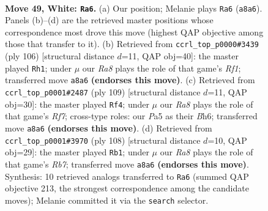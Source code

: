 \documentclass[11pt]{article}
\begin{document}
\clearpage

\begin{figure}[p]\centering
\begin{subfigure}{0.46\textwidth}\centering
\resizebox{\linewidth}{!}{%
\newchessgame
\chessboard[
  setfen={R6r/6k1/8/P7/8/6K1/8/8 w - - 1 49},
  showmover=false,
  pgfstyle=straightmove, color=movearrow, markmove={a8-a6}
]}
\caption{}
\end{subfigure}\hfill
\begin{subfigure}{0.46\textwidth}\centering
\resizebox{\linewidth}{!}{%
\newchessgame
\chessboard[
  setfen={5rk1/8/8/6pP/8/8/7K/5R2 w - - 10 54},
  showmover=false,
  pgfstyle=straightmove, color=movearrow, markmove={f1-h1}
]}
\caption{}
\end{subfigure}
\\[4pt]
\begin{subfigure}{0.46\textwidth}\centering
\resizebox{\linewidth}{!}{%
\newchessgame
\chessboard[
  setfen={8/8/6kb/8/8/8/R4r2/1K6 b - - 1 55},
  showmover=false,
  pgfstyle=straightmove, color=movearrow, markmove={f2-f4}
]}
\caption{}
\end{subfigure}\hfill
\begin{subfigure}{0.46\textwidth}\centering
\resizebox{\linewidth}{!}{%
\newchessgame
\chessboard[
  setfen={8/1R4r1/4p2k/8/4KP2/8/8/8 w - - 0 55},
  showmover=false,
  pgfstyle=straightmove, color=movearrow, markmove={b7-b1}
]}
\caption{}
\end{subfigure}
\caption{\textbf{Move 49, White: \texttt{Ra6}.} (a) Our position; Melanie plays \texttt{Ra6} (\texttt{a8a6}). Panels (b)--(d) are the retrieved master positions whose correspondence most drove this move (highest QAP objective among those that transfer to it). (b) Retrieved from \texttt{ccrl\_top\_p0000\#3439} (ply 106) [structural distance $d$=11, QAP obj=40]: the master played \texttt{Rh1}; under $\mu$ our \emph{Ra8} plays the role of that game's \emph{Rf1}; transferred move \texttt{a8a6} \textbf{(endorses this move)}. (c) Retrieved from \texttt{ccrl\_top\_p0001\#2487} (ply 109) [structural distance $d$=11, QAP obj=30]: the master played \texttt{Rf4}; under $\mu$ our \emph{Ra8} plays the role of that game's \emph{Rf7}; cross-type roles: our \emph{P}a5 as their \emph{B}h6; transferred move \texttt{a8a6} \textbf{(endorses this move)}. (d) Retrieved from \texttt{ccrl\_top\_p0001\#3970} (ply 108) [structural distance $d$=10, QAP obj=29]: the master played \texttt{Rb1}; under $\mu$ our \emph{Ra8} plays the role of that game's \emph{Rb7}; transferred move \texttt{a8a6} \textbf{(endorses this move)}. Synthesis: 10 retrieved analogs transferred to \texttt{Ra6} (summed QAP objective 213, the strongest correspondence among the candidate moves); Melanie committed it via the \texttt{search} selector.}
\label{fig:thought-m96}
\end{figure}
\end{document}
